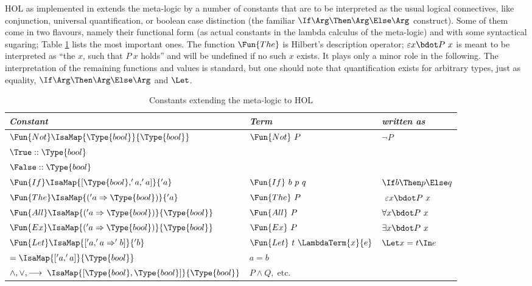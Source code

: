 HOL as implemented in \Isabelle extends the meta-logic by a number of constants
that are to be interpreted as the usual logical connectives, like conjunction,
universal quantification, or boolean case distinction (the familiar
$\If\Arg\Then\Arg\Else\Arg$ construct). Some of them come in two flavours,
namely their functional form (as actual constants in the lambda calculus of the
meta-logic) and with some syntactical sugaring; Table \ref{tab:hol-const-typ}
lists the most important ones. The function $\Fun{The}$ is Hilbert's description
operator; $\varepsilon x\bdot P\ x$ is meant to be interpreted as ``the $x$, such that $P\
x$ holds'' and will be undefined if no such $x$ exists. It plays only a minor
role in the following. The interpretation of the remaining functions and values
is standard, but one should note that quantification exists for arbitrary
types, just as equality, $\If\Arg\Then\Arg\Else\Arg$ and $\Let$. 
\begin{table}
  \centering \renewcommand{\arraystretch}{1.3}
  \begin{tabular}{|l|l|l|}\hline
    \emph{Constant}       & \emph{Term} & \emph{written as}\\\hline
    $\Fun{Not}\IsaMap{\Type{bool}}{\Type{bool}}$ & $\Fun{Not}\ P$ & $\lnot
      P$\\\hline
    $\True :: \Type{bool}$ & &\\\hline
    $\False :: \Type{bool}$ & &\\\hline
    $\Fun{If} \IsaMap{[\Type{bool}, 'a, 'a]}{'a}$ & $\Fun{If}\ b\ p\ q$ &
      $\If b\Then p \Else q$\\\hline
    $\Fun{The} \IsaMap{('a \Rightarrow \Type{bool})}{'a}$ & 
      $\Fun{The}\ P$ & $\ \varepsilon x\bdot P\ x$\\\hline
    $\Fun{All}\IsaMap{('a \Rightarrow \Type{bool})}{\Type{bool}}$ &
      $\Fun{All}\ P$ & $\forall x\bdot P\ x$\\\hline
    $\Fun{Ex}\IsaMap{('a \Rightarrow \Type{bool})}{\Type{bool}}$ &
      $\Fun{Ex}\ P$ & $\exists x\bdot P\ x$\\\hline
    $\Fun{Let}\IsaMap{['a, 'a \Rightarrow 'b]}{'b}$ & 
      $\Fun{Let}\ t\ \LambdaTerm{x}{e}$ & $\Let x = t \In e$\\\hline
    $= \IsaMap{['a, 'a]}{\Type{bool}}$ & 
      $a = b$ & \\\hline
    $\land, \lor, \longrightarrow\; \IsaMap{[\Type{bool}, \Type{bool}]}{\Type{bool}}$ &
      $P \land Q,\; \text{etc.}$ &\\\hline
  \end{tabular}
  \caption{Constants extending the meta-logic to HOL}
  \label{tab:hol-const-typ}
\end{table}


